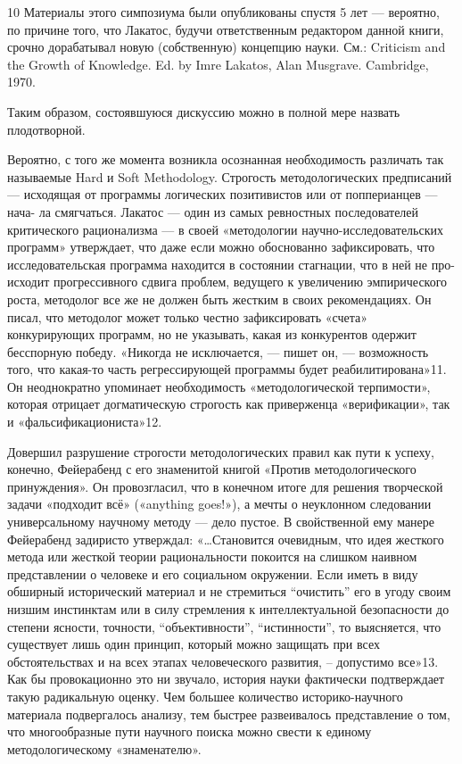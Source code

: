\documentclass[11pt,a4paper]{article}
\begin{document}
10 Материалы этого симпозиума были опубликованы спустя 5 лет — вероятно, по
причине того, что Лакатос, будучи ответственным редактором данной книги,
срочно дорабатывал новую (собственную) концепцию науки.  См.: Criticism and
the Growth of Knowledge. Ed. by Imre Lakatos, Alan Musgrave. Cambridge, 1970.

Таким образом, состоявшуюся дискуссию можно в полной мере назвать
плодотворной.

Вероятно, с того же момента возникла осознанная необходимость различать так
называемые Hard и Soft Methodology.  Строгость методологических предписаний —
исходящая от программы логических позитивистов или от попперианцев — нача-
ла смягчаться. Лакатос — один из самых ревностных последователей
критического рационализма — в своей «методологии научно-исследовательских
программ» утверждает, что даже если можно обоснованно зафиксировать, что
исследовательская программа находится в состоянии стагнации, что в ней не про-
исходит прогрессивного сдвига проблем, ведущего к увеличению эмпирического
роста, методолог все же не должен быть жестким в своих рекомендациях. Он
писал, что методолог может только честно зафиксировать «счета» конкурирующих
программ, но не указывать, какая из конкурентов одержит бесспорную
победу. «Никогда не исключается, — пишет он, — возможность того, что
какая-то часть регрессирующей программы будет реабилитирована»11. Он
неоднократно упоминает необходимость «методологической терпимости», которая
отрицает догматическую строгость как приверженца «верификации», так и
«фальсификациониста»12.

Довершил разрушение строгости методологических правил как пути к успеху,
конечно, Фейерабенд с его знаменитой книгой «Против методологического
принуждения». Он провозгласил, что в конечном итоге для решения творческой
задачи «подходит всё» («anything goes!»), а мечты о неуклонном следовании
универсальному научному методу — дело пустое. В свойственной ему манере
Фейерабенд задиристо утверждал: «…Становится очевидным, что идея жесткого
метода или жесткой теории рациональности покоится на слишком наивном
представлении о человеке и его социальном окружении. Если иметь в виду
обширный исторический материал и не стремиться “очистить” его в угоду своим
низшим инстинктам или в силу стремления к интеллектуальной безопасности до
степени ясности, точности, “объективности”, “истинности”, то выясняется, что
существует лишь один принцип, который можно защищать при всех обстоятельствах
и на всех этапах человеческого развития, – допустимо все»13. Как бы
провокационно это ни звучало, история науки фактически подтверждает такую
радикальную оценку. Чем большее количество историко-научного материала
подвергалось анализу, тем быстрее развеивалось представление о том, что
многообразные пути научного поиска можно свести к единому методологическому
«знаменателю».
\end{document}
